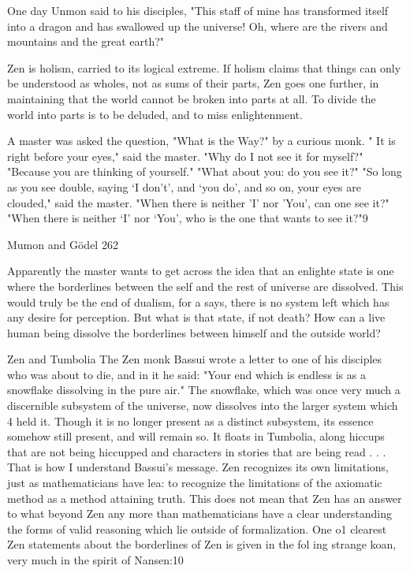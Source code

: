    One day Unmon said to his disciples, "This staff of mine has transformed itself into a
   dragon and has swallowed up the universe! Oh, where are the rivers and mountains
   and the great earth?"

Zen is holism, carried to its logical extreme. If holism claims that things can only be
understood as wholes, not as sums of their parts, Zen goes one further, in maintaining that
the world cannot be broken into parts at all. To divide the world into parts is to be
deluded, and to miss enlightenment.

   A master was asked the question, "What is the Way?" by a curious monk. "
     It is right before your eyes," said the master. "Why do I not see it for myself?"
     "Because you are thinking of yourself."
     "What about you: do you see it?"
     "So long as you see double, saying `I don't', and `you do', and so on, your
   eyes are clouded," said the master.
     "When there is neither 'I' nor 'You', can one see it?"
     "When there is neither `I' nor `You', who is the one that wants to see it?"9


Mumon and Gödel                                                                            262

      Apparently the master wants to get across the idea that an enlighte state is one
where the borderlines between the self and the rest of universe are dissolved. This would
truly be the end of dualism, for a says, there is no system left which has any desire for
perception. But what is that state, if not death? How can a live human being dissolve the
borderlines between himself and the outside world?

                                  Zen and Tumbolia
The Zen monk Bassui wrote a letter to one of his disciples who was about to die, and in it
he said: "Your end which is endless is as a snowflake dissolving in the pure air." The
snowflake, which was once very much a discernible subsystem of the universe, now
dissolves into the larger system which 4 held it. Though it is no longer present as a
distinct subsystem, its essence somehow still present, and will remain so. It floats in
Tumbolia, along hiccups that are not being hiccupped and characters in stories that are
being read . . . That is how I understand Bassui's message.
        Zen recognizes its own limitations, just as mathematicians have lea: to recognize
the limitations of the axiomatic method as a method attaining truth. This does not mean
that Zen has an answer to what beyond Zen any more than mathematicians have a clear
understanding the forms of valid reasoning which lie outside of formalization. One o1
clearest Zen statements about the borderlines of Zen is given in the fol ing strange koan,
very much in the spirit of Nansen:10

